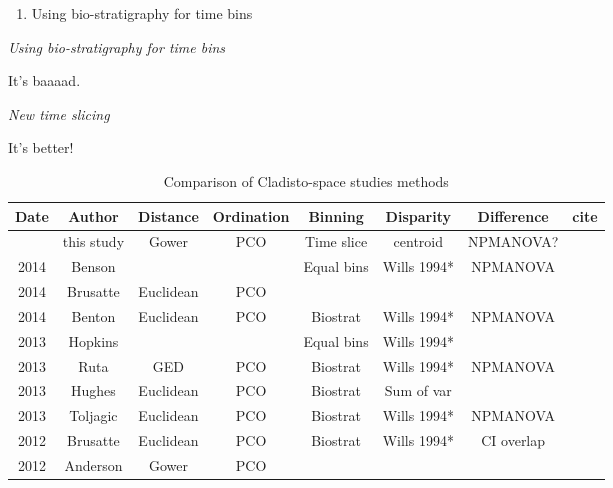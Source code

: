 \documentclass[12pt,letterpaper]{article}
\renewcommand{\subsection}[1]{%
\bigskip
\begin{center}
\begin{large}
\normalfont\itshape #1
\end{large}
\end{center}}
\begin{document}
\begin{enumerate}
\item{Using bio-stratigraphy for time bins}
\end{enumerate}

\subsection{Using bio-stratigraphy for time bins}

It's baaaad.

\subsection{New time slicing}

It's better!

\begin{table}[ht]
\caption{Comparison of Cladisto-space studies methods}
\centering
\begin{tabular}{cccccccc}
  \hline
    Date & Author      & Distance  & Ordination & Binning    & Disparity   & Difference & cite \\ %
  \hline
         & this study  & Gower     & PCO        & Time slice & centroid    & NPMANOVA?  & \\
    2014 & Benson      &           &            & Equal bins & Wills 1994* & NPMANOVA   & \cite{bensonfaunal2014} \\
    2014 & Brusatte    & Euclidean & PCO        &            &             &            & \cite{brusattegradual2014} \\
    2014 & Benton      & Euclidean & PCO        & Biostrat   & Wills 1994* & NPMANOVA   & \cite{bentonmodels2014} \\
    2013 & Hopkins     &           &            & Equal bins & Wills 1994* &            & \cite{hopkinsdecoupling2013} \\             
    2013 & Ruta        & GED       & PCO        & Biostrat   & Wills 1994* & NPMANOVA   & \cite{ruta2013} \\
    2013 & Hughes      & Euclidean & PCO        & Biostrat   & Sum of var  &            & \cite{Hughes20082013} \\
    2013 & Toljagic    & Euclidean & PCO        & Biostrat   & Wills 1994* & NPMANOVA   & \cite{toljagictriassic-jurassic2013} \\
    2012 & Brusatte    & Euclidean & PCO        & Biostrat   & Wills 1994* & CI overlap & \cite{brusattedinosaur2012} \\
    2012 & Anderson    & Gower     & PCO        &            &             &            & \cite{anderson2012using} \\

\end{tabular}
\end{table}
\end{document}
